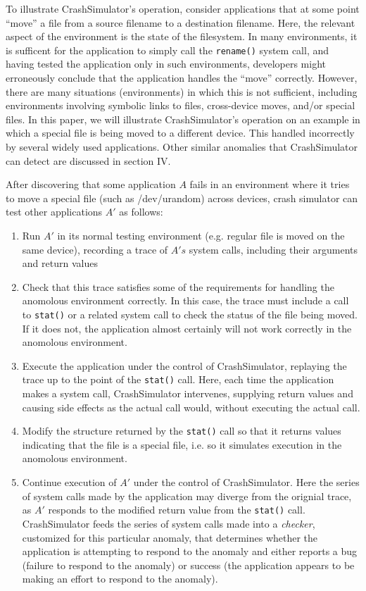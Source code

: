 To illustrate CrashSimulator's operation, consider applications that
at some point ``move'' a file from a source filename to a destination filename.
Here, the relevant aspect of the environment is the state of the filesystem.
In many environments, it is sufficent for the application to simply call the {\tt rename()} system call, and having tested
the application only in such environments, developers might erroneously conclude that the application handles the ``move'' correctly.
However, there are many situations (environments) in which this is not sufficient, including environments involving symbolic links to files,
cross-device moves, and/or special files.
In this paper, we will illustrate CrashSimulator's operation on an example in which a special file is being moved to a different device.
This handled incorrectly by several widely used applications. Other similar anomalies that CrashSimulator can detect
are discussed in section IV.

After discovering that some application $A$ fails in an environment where it tries to move a special file (such as /dev/urandom) across
devices, crash simulator can test other applications $A'$ as follows:
\begin{enumerate}
	\item
		Run $A'$ in its normal testing environment (e.g. regular file is moved on the same device), recording a trace of $A's$ system calls, including their arguments and return values
	\item
		Check that this trace satisfies some of the requirements for handling the anomolous environment correctly. In this case, the trace must include a call to {\tt stat()} or a related system call to check the status of the file being moved. If it does not, the application almost certainly will not work correctly in the anomolous environment.
	\item Execute the application under the control of CrashSimulator, replaying the trace up to the point of the {\tt stat()} call. Here, each time the application makes a system call, CrashSimulator intervenes, supplying return values and causing side effects as the actual call would, without executing the actual call.
	\item
		Modify the structure returned by the {\tt stat()} call so that it returns values indicating that the file is a special file, i.e. so it simulates execution in the anomolous environment.
	\item
		Continue execution of $A'$ under the control of CrashSimulator. Here the series of system calls made by
                the application may diverge from the orignial trace, as $A'$ responds to the modified return value from
                the {\tt stat()} call. CrashSimulator feeds the series of system calls made into a {\em checker},
                customized for this particular anomaly, that determines whether the application is attempting to respond
                to the anomaly and either reports a bug (failure to respond to the anomaly) or success (the application
                appears to be making an effort to respond to the anomaly).
\end{enumerate}

